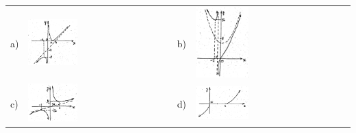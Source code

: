\documentclass[11pt]{amsbook}
\begin{document}

\begin{hEnumerateArabic}

\item 

\begin{tabular}{p{0pt} p{} p{0pt} p{}}
	\vspace{0pt} a)
	&
	\vspace{0pt} \includegraphics[width=0.35\textwidth]{images/b1p1-231-fig01}
	&
	\vspace{0pt} b)
	&
	\vspace{0pt} \includegraphics[width=0.35\textwidth]{images/b1p1-231-fig02}
	
	\\

	\vspace{0pt} c)
	&
	\vspace{0pt} \includegraphics[width=0.35\textwidth]{images/b1p1-231-fig03}
	&
	\vspace{0pt} d)
	&
	\vspace{0pt} \includegraphics[width=0.35\textwidth]{images/b1p1-231-fig04}
\end{tabular}
\\


\end{hEnumerateArabic}
\end{document}
